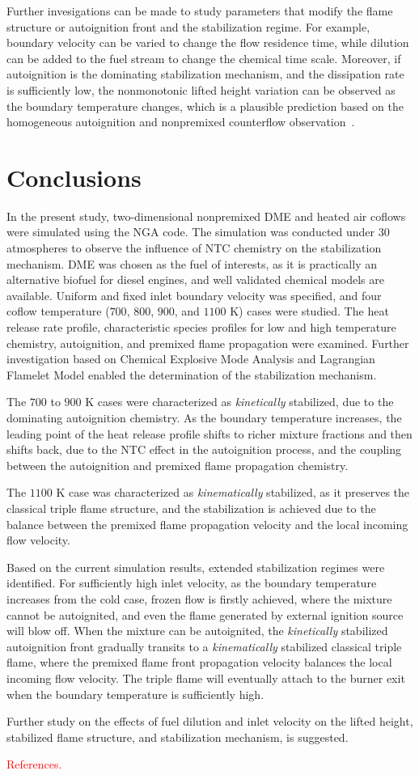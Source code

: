 \documentclass[review,3p,times]{elsarticleUS}
\begin{document}
Further invesigations can be made to study parameters that modify the flame structure or autoignition front and the stabilization regime.  For example, boundary velocity can be varied to change the flow residence time, while dilution can be added to the fuel stream to change the chemical time scale.  Moreover, if autoignition is the dominating stabilization mechanism, and the dissipation rate is sufficiently low, the nonmonotonic lifted height variation can be observed as the boundary temperature changes, which is a plausible prediction based on the homogeneous autoignition and nonpremixed counterflow observation~\cite{deng14}.

\section{Conclusions}

In the present study, two-dimensional nonpremixed DME and heated air coflows were simulated using the NGA code.  The simulation was conducted under $30$ atmospheres to observe the influence of NTC chemistry on the stabilization mechanism.  DME was chosen as the fuel of interests, as it is practically an alternative biofuel for diesel engines, and well validated chemical models are available.  Uniform and fixed inlet boundary velocity was specified, and four coflow temperature ($700$, $800$, $900$, and $1100$ K) cases were studied.  The heat release rate profile, characteristic species profiles for low and high temperature chemistry, autoignition, and premixed flame propagation were examined.  Further investigation based on Chemical Explosive Mode Analysis and Lagrangian Flamelet Model enabled the determination of the stabilization mechanism.  

The $700$ to $900$ K cases were characterized as \emph {kinetically} stabilized, due to the dominating autoignition chemistry.  As the boundary temperature increases, the leading point of the heat release profile shifts to richer mixture fractions and then shifts back, due to the NTC effect in the autoignition process, and the coupling between the autoignition and premixed flame propagation chemistry.  

The $1100$ K case was characterized as \emph {kinematically} stabilized, as it preserves the classical triple flame structure, and the stabilization is achieved due to the balance between the premixed flame propagation velocity and the local incoming flow velocity.

Based on the current simulation results, extended stabilization regimes were identified.  For sufficiently high inlet velocity, as the boundary temperature increases from the cold case, frozen flow is firstly achieved, where the mixture cannot be autoignited, and even the flame generated by external ignition source will blow off.  When the mixture can be autoignited, the \emph {kinetically} stabilized autoignition front gradually transits to a \emph {kinematically} stabilized classical triple flame, where the premixed flame front propagation velocity balances the local incoming flow velocity.  The triple flame will eventually attach to the burner exit when the boundary temperature is sufficiently high.

Further study on the effects of fuel dilution and inlet velocity on the lifted height, stabilized flame structure, and stabilization mechanism, is suggested. 

\textcolor{red}{References.}
\end{document}
